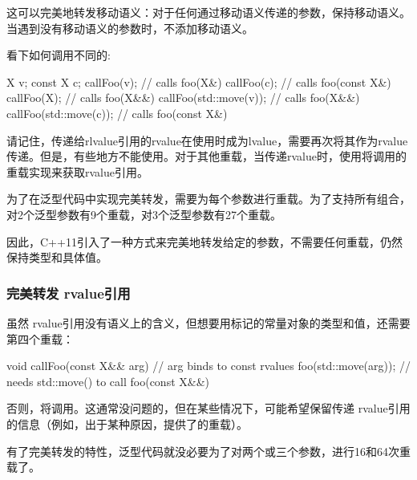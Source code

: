 这可以完美地转发移动语义：对于任何通过移动语义传递的参数，保持移动语义。当遇到没有移动语义的参数时，不添加移动语义。

看下如何调用不同的:

\begin{cppcode}
X v;
const X c;
callFoo(v); // calls foo(X&)
callFoo(c); // calls foo(const X&)
callFoo(X{}); // calls foo(X&&)
callFoo(std::move(v)); // calls foo(X&&)
callFoo(std::move(c)); // calls foo(const X&)
\end{cppcode}

请记住，传递给rlvalue引用的rvalue在使用时成为lvalue，需要再次将其作为rvalue传递。但是，有些地方不能使用。对于其他重载，当传递rvalue时，使用将调用的重载实现来获取rvalue引用。

为了在泛型代码中实现完美转发，需要为每个参数进行重载。为了支持所有组合，对2个泛型参数有9个重载，对3个泛型参数有27个重载。

因此，C++11引入了一种方式来完美地转发给定的参数，不需要任何重载，仍然保持类型和具体值。

\subsubsection{完美转发 rvalue引用}

虽然 rvalue引用没有语义上的含义，但想要用标记的常量对象的类型和值，还需要第四个重载：

\begin{cppcode}
void callFoo(const X&& arg) { // arg binds to const rvalues
	foo(std::move(arg)); // needs std::move() to call foo(const X&&)
}
\end{cppcode}

否则，将调用。这通常没问题的，但在某些情况下，可能希望保留传递 rvalue引用的信息（例如，出于某种原因，提供了的重载）。

有了完美转发的特性，泛型代码就没必要为了对两个或三个参数，进行16和64次重载了。


















